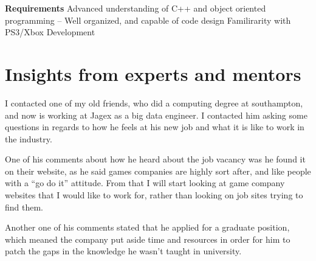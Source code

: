 \documentclass{scrartcl}
\begin{document}
\textbf{Requirements}
Advanced understanding of C++ and object oriented programming
– Well organized, and capable of code design
Familirarity with PS3/Xbox Development


\section{Insights from experts and mentors}

I contacted one of my old friends, who did a computing degree at southampton, and now is working at Jagex as a big data engineer. 
I contacted him asking some questions in regards to how he feels at his new job and what it is like to work in the industry.

One of his comments about how he heard about the job vacancy was he found it on their website, as he said games companies are highly sort after, and like people with a ``go do it'' attitude.
From that I will start looking at game company websites that I would like to work for, rather than looking on job sites trying to find them.

Another one of his comments stated that he applied for a graduate position, which meaned the company put aside time and resources in order for him to patch the gaps in the knowledge he wasn't taught in university.
\end{document}

